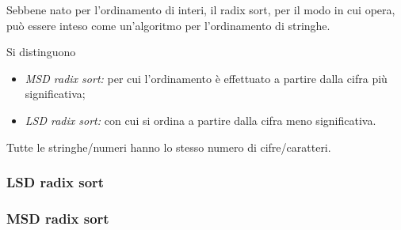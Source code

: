 \documentclass{subfiles}
\begin{document}
Sebbene nato per l'ordinamento di interi, il radix sort, per il modo in cui opera,
può essere inteso come un'algoritmo per l'ordinamento di stringhe.

Si distinguono
\begin{itemize}
    \item \emph{MSD radix sort:} per cui l'ordinamento è effettuato a partire dalla cifra più significativa;
    \item \emph{LSD radix sort:} con cui si ordina a partire dalla cifra meno significativa.
\end{itemize}

\begin{Remark*}
    Tutte le stringhe/numeri hanno lo stesso numero di cifre/caratteri.
\end{Remark*}

\subsubsection{LSD radix sort}


\subsubsection{MSD radix sort}

\end{document}
